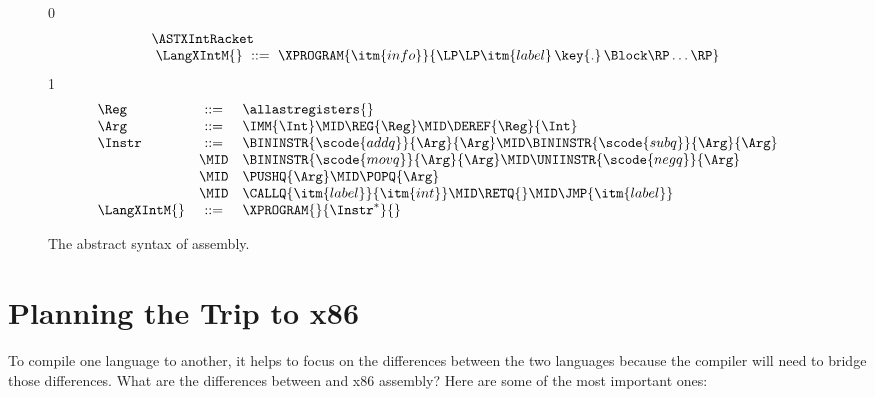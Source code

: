 \documentclass[7x10]{TimesAPriori_MIT}%
\def\racketEd{0}
\def\pythonEd{1}
\def\edition{0}
\numberwithin{theorem}{chapter}
\numberwithin{definition}{chapter}
\numberwithin{equation}{chapter}
\begin{document}
\begin{figure}[tp]
\begin{tcolorbox}[colback=white]
\small
{\if\edition\racketEd
\[\arraycolsep=3pt
\begin{array}{l}
  \ASTXIntRacket \\
\begin{array}{lcl}
\LangXIntM{} &::= & \XPROGRAM{\itm{info}}{\LP\LP\itm{label} \,\key{.}\, \Block \RP\ldots\RP}
\end{array}
\end{array}
\]
\fi}
{\if\edition\pythonEd
\[
\begin{array}{lcl}
\Reg &::=& \allastregisters{} \\
\Arg &::=&  \IMM{\Int} \MID \REG{\Reg}
   \MID \DEREF{\Reg}{\Int} \\
\Instr &::=& \BININSTR{\scode{addq}}{\Arg}{\Arg} 
       \MID \BININSTR{\scode{subq}}{\Arg}{\Arg} \\
       &\MID& \BININSTR{\scode{movq}}{\Arg}{\Arg}
       \MID \UNIINSTR{\scode{negq}}{\Arg}\\
       &\MID&  \PUSHQ{\Arg} \MID \POPQ{\Arg} \\
       &\MID& \CALLQ{\itm{label}}{\itm{int}} \MID \RETQ{}  \MID \JMP{\itm{label}} \\
\LangXIntM{} &::= & \XPROGRAM{}{\Instr^{*}}{}
\end{array}
\]
\fi}
\end{tcolorbox}
\caption{The abstract syntax of \LangXInt{} assembly.}
\label{fig:x86-int-ast}
\end{figure}

\section{Planning the Trip to x86}
\label{sec:plan-s0-x86}

To compile one language to another, it helps to focus on the
differences between the two languages because the compiler will need
to bridge those differences. What are the differences between \LangVar{}
and x86 assembly? Here are some of the most important ones:
\end{document}
